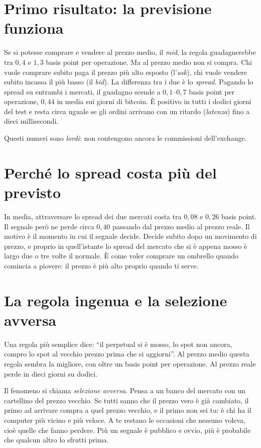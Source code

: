 \documentclass[a4paper,11pt]{article}
\begin{document}
\section*{Primo risultato: la previsione funziona}

Se si potesse comprare e vendere al prezzo medio, il \emph{mid}, la regola guadagnerebbe tra $0{,}4$ e $1{,}3$ basis point per operazione. Ma al prezzo medio non si compra. Chi vuole comprare subito paga il prezzo più alto esposto (l'\emph{ask}), chi vuole vendere subito incassa il più basso (il \emph{bid}). La differenza tra i due è lo \emph{spread}. Pagando lo spread su entrambi i mercati, il guadagno scende a $0{,}1$--$0{,}7$ basis point per operazione, $0{,}44$ in media sui giorni di bitcoin. È positivo in tutti i dodici giorni del test e resta circa uguale se gli ordini arrivano con un ritardo (\emph{latenza}) fino a dieci millisecondi.

Questi numeri sono \emph{lordi}: non contengono ancora le commissioni dell'exchange.

\section*{Perché lo spread costa più del previsto}

In media, attraversare lo spread dei due mercati costa tra $0{,}08$ e $0{,}26$ basis point. Il segnale però ne perde circa $0{,}40$ passando dal prezzo medio al prezzo reale. Il motivo è il momento in cui il segnale decide. Decide subito dopo un movimento di prezzo, e proprio in quell'istante lo spread del mercato che si è appena mosso è largo due o tre volte il normale. È come voler comprare un ombrello quando comincia a piovere: il prezzo è più alto proprio quando ti serve.

\section*{La regola ingenua e la selezione avversa}

Una regola più semplice dice: \enquote{il perpetual si è mosso, lo spot non ancora, compro lo spot al vecchio prezzo prima che si aggiorni}. Al prezzo medio questa regola sembra la migliore, con oltre un basis point per operazione. Al prezzo reale perde in dieci giorni su dodici.

Il fenomeno si chiama \emph{selezione avversa}. Pensa a un banco del mercato con un cartellino del prezzo vecchio. Se tutti sanno che il prezzo vero è già cambiato, il primo ad arrivare compra a quel prezzo vecchio, e il primo non sei tu: è chi ha il computer più vicino e più veloce. A te restano le occasioni che nessuno voleva, cioè quelle che fanno perdere. Più un segnale è pubblico e ovvio, più è probabile che qualcun altro lo sfrutti prima.
\end{document}
